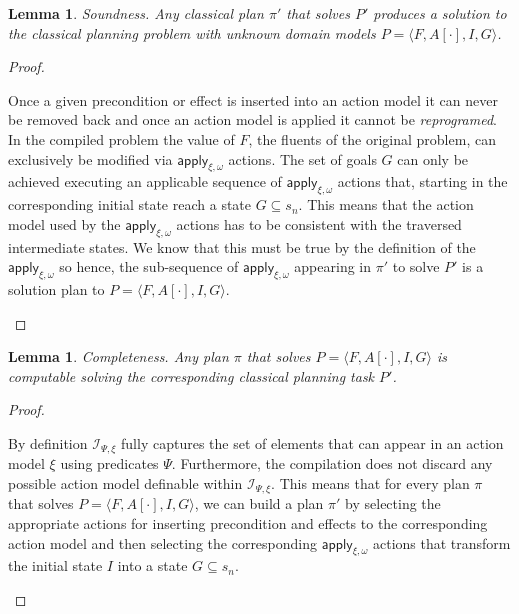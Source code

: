 \documentclass{article}
\newcommand{\tup}[1]{{\langle #1 \rangle}}
\newtheorem{mylemma}[mytheorem]{Lemma}
\begin{document}
\begin{mylemma}
Soundness. Any classical plan $\pi'$ that solves $P'$ produces a solution to the classical planning problem with unknown domain models $P=\tup{F,A[\cdot],I,G}$.
\end{mylemma}

\begin{proof}[Proof]
\begin{small}
Once a given precondition or effect is inserted into an action model it can never be removed back and once an action model is applied it cannot be {\em reprogramed}. In the compiled problem the value of $F$, the fluents of the original problem, can exclusively be modified via $\mathsf{apply_{\xi,\omega}}$ actions.  The set of goals $G$ can only be achieved executing an applicable sequence of $\mathsf{apply_{\xi,\omega}}$ actions that, starting in the corresponding initial state reach a state $G \subseteq s_n$. This means that the action model used by the $\mathsf{apply_{\xi,\omega}}$ actions has to be consistent with the traversed intermediate states. We know that this must be true by the definition of the $\mathsf{apply_{\xi,\omega}}$ so hence, the sub-sequence of $\mathsf{apply_{\xi,\omega}}$ appearing in $\pi'$ to solve $P'$ is a solution plan to $P=\tup{F,A[\cdot],I,G}$. 
\end{small}
\end{proof}

\begin{mylemma}
Completeness. Any plan $\pi$ that solves $P=\tup{F,A[\cdot],I,G}$ is computable solving the corresponding classical planning task $P'$.
\end{mylemma}

\begin{proof}[Proof]
\begin{small}
By definition ${\mathcal I}_{\Psi,\xi}$ fully captures the set of elements that can appear in an action model $\xi$ using predicates $\Psi$. Furthermore, the compilation does not discard any possible action model definable within ${\mathcal I}_{\Psi,\xi}$. This means that for every plan $\pi$ that solves $P=\tup{F,A[\cdot],I,G}$, we can build a plan $\pi'$ by selecting the appropriate actions for inserting precondition and effects to the corresponding action model and then selecting the corresponding $\mathsf{apply_{\xi,\omega}}$ actions that transform the initial state $I$ into a state $G \subseteq s_n$.
\end{small}
\end{proof}
\end{document}
